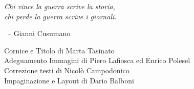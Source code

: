 \begin{myquote}\it
  Chi vince la guerra scrive la storia,\\
  chi perde la guerra scrive i giornali.
  
  {~\hfill\normalfont -- Gianni Cusumano}
\end{myquote}

\vfill

\begin{minipage}{0.80\textwidth}\fontsize{10}{15}\selectfont
  Cornice e Titolo di Marta Tasinato\\
  Adeguamento Immagini di Piero Lafiosca ed Enrico Polesel\\
  Correzione testi di Nicolò Campodonico\\
  Impaginazione e Layout di Dario Balboni
\end{minipage}
\clearpage

